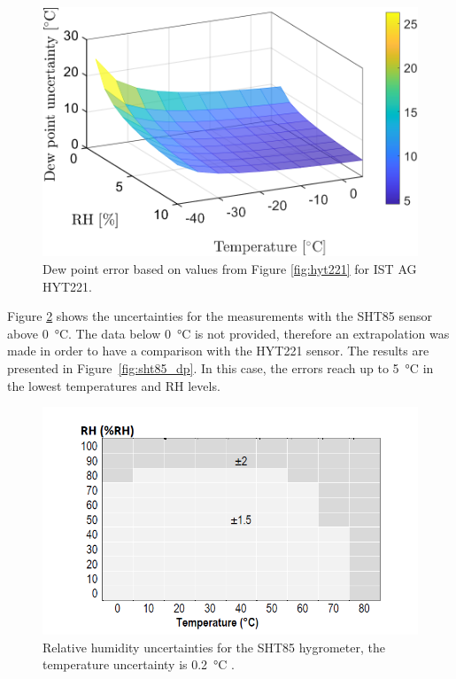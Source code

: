 \begin{figure}[!h]
\centering
\includegraphics[width=0.6\columnwidth]{Chapter5/images/HYT221RH7T15.png}
\caption{Dew point error based on values from Figure \ref{fig:hyt221} for IST AG HYT221.}
\label{fig:hyt221_dp}
\end{figure}
\newpage
Figure \ref{fig:sht85} shows the uncertainties for the measurements with the SHT85 sensor above \SI{0}{\celsius}. The data below \SI{0}{\celsius} is not provided, therefore an extrapolation was made in order to have a comparison with the HYT221 sensor. The results are presented in Figure~\ref{fig:sht85_dp}. In this case, the errors reach up to \SI{5}{\celsius} in the lowest temperatures and \gls{RH} levels.
\begin{figure}[!h]
\centering
\includegraphics[width=0.65\columnwidth]{Chapter5/images/sht85_rh.png}
\caption{Relative humidity uncertainties for the SHT85 hygrometer, the temperature uncertainty is \SI{0.2}{\celsius} \cite{SHT85}.}
\label{fig:sht85}
\end{figure}

